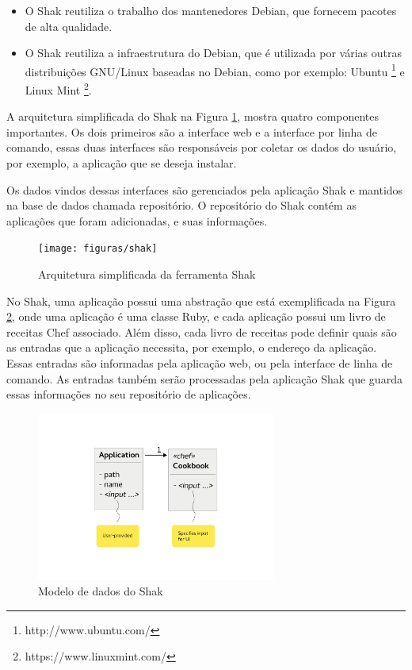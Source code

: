 \begin{itemize}

  \item O Shak reutiliza o trabalho dos mantenedores Debian, que fornecem pacotes
    de alta qualidade.

  \item O Shak reutiliza a infraestrutura do Debian, que é utilizada por várias
outras distribuições GNU/Linux baseadas no Debian, como por exemplo: Ubuntu \footnote{http://www.ubuntu.com/} e Linux Mint \footnote{https://www.linuxmint.com/}.

\end{itemize}

A arquitetura simplificada do Shak na Figura \ref{fig:shak}, mostra quatro
componentes importantes. Os dois primeiros são a interface web e a interface
por linha de comando, essas duas interfaces são responsáveis por coletar os
dados do usuário, por exemplo, a aplicação que se deseja instalar.

Os dados vindos dessas interfaces são gerenciados pela aplicação Shak e mantidos
na base de dados chamada repositório. O repositório do Shak contém as aplicações
que foram adicionadas, e suas informações.

\begin{figure}[h]
  \centering
  \texttt{[image: figuras/shak]}
      \caption{Arquitetura simplificada da ferramenta Shak}
  \label{fig:shak}
\end{figure}

No Shak, uma aplicação possui uma abstração que está exemplificada na Figura \ref{fig:shak2},
onde uma aplicação é uma classe Ruby, e cada aplicação possui um livro de receitas
Chef associado. Além disso, cada livro de receitas pode definir quais são as entradas que
a aplicação necessita, por exemplo, o endereço da aplicação. Essas entradas
são informadas pela aplicação web, ou pela interface de linha de comando. As entradas 
também serão processadas pela aplicação Shak que guarda essas informações no
seu repositório de aplicações. 

\begin{figure}[h]
  \centering
  \includegraphics[width=0.7\textwidth]
      {figuras/data-model}
      \caption{Modelo de dados do Shak}
  \label{fig:shak2}
\end{figure}

